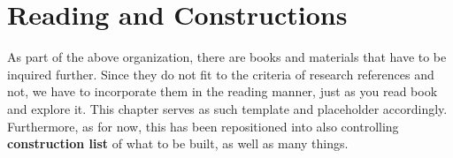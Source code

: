 \chapter{Reading and Constructions}
As part of the above organization, there are books and materials that have to be inquired further. Since they do not fit to the criteria of research references and not, we have to incorporate them in the reading manner, just as you read book and explore it. This chapter serves as such template and placeholder accordingly. Furthermore, as for now, this has been repositioned into also controlling \textbf{construction list} of what to be built, as well as many things. 